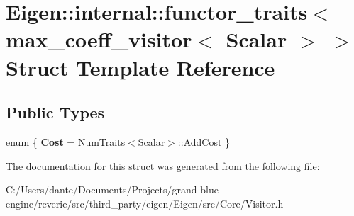 \hypertarget{struct_eigen_1_1internal_1_1functor__traits_3_01max__coeff__visitor_3_01_scalar_01_4_01_4}{}\section{Eigen\+::internal\+::functor\+\_\+traits$<$ max\+\_\+coeff\+\_\+visitor$<$ Scalar $>$ $>$ Struct Template Reference}
\label{struct_eigen_1_1internal_1_1functor__traits_3_01max__coeff__visitor_3_01_scalar_01_4_01_4}
\subsection*{Public Types}
\begin{DoxyCompactItemize}
\item 
\mbox{\label{struct_eigen_1_1internal_1_1functor__traits_3_01max__coeff__visitor_3_01_scalar_01_4_01_4_a541bdf19d9e8d1305b1764118456b909}} 
enum \{ {\bfseries Cost} = Num\+Traits$<$Scalar$>$\+::Add\+Cost
 \}
\end{DoxyCompactItemize}


The documentation for this struct was generated from the following file\+:\begin{DoxyCompactItemize}
\item 
C\+:/\+Users/dante/\+Documents/\+Projects/grand-\/blue-\/engine/reverie/src/third\+\_\+party/eigen/\+Eigen/src/\+Core/Visitor.\+h\end{DoxyCompactItemize}
